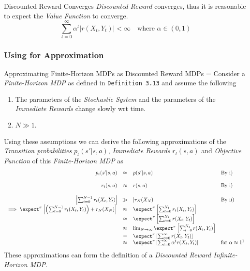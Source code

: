 \documentclass[11pt,a4paper]{article}
\begin{document}
  \begin{theorem}{Discounted Reward Converges}
    \textit{Discounted Reward} converges, thus it is reasonable to expect the \textit{Value Function} to converge.
    \[ \sum_{t=0}^\infty\alpha^t|r(X_t,Y_t)|<\infty\quad\text{where }\alpha\in(0,1) \]
  \end{theorem}

\subsubsection{Using for Approximation}

  \begin{proposition}{Approximating Finite-Horizon MDPs as Discounted Reward MDPs}
    \everymath={\displaystyle}
    Consider a \textit{Finite-Horizon MDP} as defined in \texttt{Definition 3.13}  and assume the following
    \begin{enumerate}
      \item The parameters of the \textit{Stochastic System} and the parameters of the \textit{Immediate Rewards} change slowly wrt time.
      \item $N\gg1$.
    \end{enumerate}
    Using these assumptions we can derive the following approximations of the \textit{Transition probabilities} $p_t(s'|s,a)$, \textit{Immediate Rewards} $r_t(s,a)$ and \textit{Objective Function} of this \textit{Finite-Horizon MDP} as
    \[\begin{array}{rcll}
      p_t(s'|s,a)&\approx&p(s'|s,a)&\text{By i)}\\\\
      r_t(s,a)&\approx&r(s,a)&\text{By i)}\\\\
      \left|\sum_{t=0}^{N-1}r_t(X_t,Y_t)\right|&\gg&|r_N(X_N)|&\text{By ii)}\\
      \implies\expect^\pi\left[\left(\sum_{t=0}^{N-1}r_t(X_t,Y_t)\right)+r_N(X_N)\right]&\approx&\expect^\pi\left[\sum_{t=0}^{N_1}r_t(X_t,Y_t)\right]\\
      &\approx&\expect^\pi\left[\sum_{t=0}^{N_1}r(X_t,Y_t)\right]\\
      &\approx&\lim_{N\to\infty}\expect^\pi\left[\sum_{t=0}^{N_1}r(X_t,Y_t)\right]\\
      &=&\expect^\pi\left[\sum_{t=0}^\infty r(X_t,Y_t)\right]\\
      &\approx&\expect^\pi\left[\sum_{t=0}^\infty \alpha^tr(X_t,Y_t)\right]&\text{for }\alpha\approx1\footnotemark\\
    \end{array}\]
    These approximations can form the definition of a \textit{Discounted Reward Infinite-Horizon MDP}.
  \end{proposition}
\end{document}
